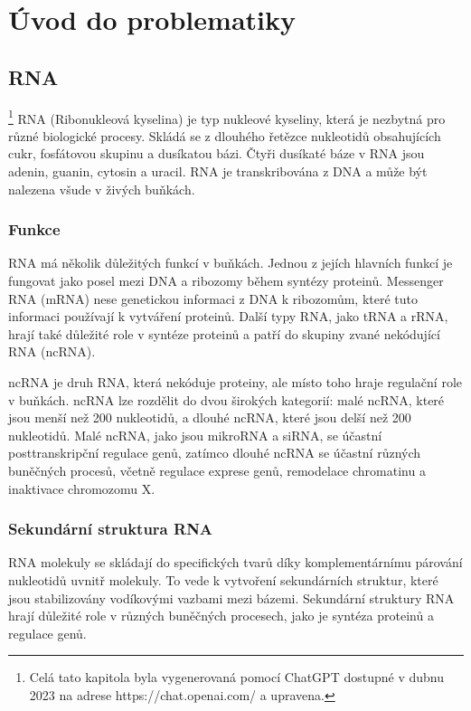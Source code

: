 
\chapter{Úvod do problematiky} \label{rnauvod}

\section{RNA}

\footnote{Celá tato kapitola byla vygenerovaná pomocí ChatGPT dostupné v dubnu
2023 na adrese https://chat.openai.com/ a upravena.} RNA (Ribonukleová
kyselina) je typ nukleové kyseliny, která je nezbytná pro různé biologické
procesy. Skládá se z dlouhého řetězce nukleotidů obsahujících cukr, fosfátovou
skupinu a dusíkatou bázi. Čtyři dusíkaté báze v RNA jsou adenin, guanin,
cytosin a uracil. RNA je transkribována z DNA a může být nalezena všude v
živých buňkách.

\subsection{Funkce}

RNA má několik důležitých funkcí v buňkách. Jednou z jejích hlavních funkcí je
fungovat jako posel mezi DNA a ribozomy během syntézy proteinů. Messenger RNA
(mRNA) nese genetickou informaci z DNA k ribozomům, které tuto informaci
používají k vytváření proteinů. Další typy RNA, jako tRNA a rRNA, hrají také
důležité role v syntéze proteinů a patří do skupiny zvané nekódující RNA
(ncRNA).

ncRNA je druh RNA, která nekóduje proteiny, ale místo toho hraje regulační role
v buňkách. ncRNA lze rozdělit do dvou širokých kategorií: malé ncRNA, které
jsou menší než 200 nukleotidů, a dlouhé ncRNA, které jsou delší než 200
nukleotidů. Malé ncRNA, jako jsou mikroRNA a siRNA, se účastní posttranskripční
regulace genů, zatímco dlouhé ncRNA se účastní různých buněčných procesů,
včetně regulace exprese genů, remodelace chromatinu a inaktivace chromozomu X.

\subsection{Sekundární struktura RNA}

RNA molekuly se skládají do specifických tvarů díky komplementárnímu párování
nukleotidů uvnitř molekuly. To vede k vytvoření sekundárních struktur, které
jsou stabilizovány vodíkovými vazbami mezi bázemi. Sekundární struktury RNA
hrají důležité role v různých buněčných procesech, jako je syntéza proteinů a
regulace genů.

